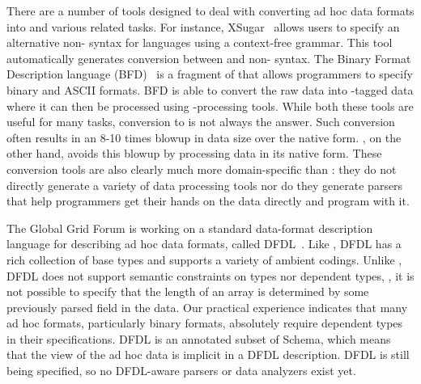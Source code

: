 There are a number of tools designed to deal with converting ad hoc
data formats into \xml{} and various related tasks.  For instance,
XSugar~\cite{brabrand+:xsugar2005} allows users to specify an
alternative non-\xml{} syntax for \xml{} languages using a context-free
grammar.  This tool automatically generates conversion between \xml{} and
non-\xml{} syntax.  The Binary Format Description language 
(BFD)~\cite{bfd} is a fragment of
\xml{} that allows programmers to specify binary and ASCII formats.  BFD
is able to convert the raw data into \xml{}-tagged data where it can then be
processed using \xml{}-processing tools.    While both these tools are 
useful for many
tasks, conversion to \xml{} is not always the answer.  Such conversion
often results in an 8-10 times blowup in data size over the native form.
\padsml{}, on the other hand, avoids this blowup by processing data in its 
native form.  These conversion tools are also clearly much more 
domain-specific than \padsml{}:  they do not directly generate a variety of 
data processing tools nor do they generate parsers that help programmers
get their hands on the data directly and program with it.

The Global Grid Forum is working on a standard
data-format description language for describing ad hoc data formats,
called DFDL~\cite{dfdl-proposal,dfdl-primer}.  Like \padsml{},
DFDL{} has a rich collection of base types and supports a variety of
ambient codings.  Unlike \padsml{}, DFDL{} does not support semantic
constraints on types nor dependent types, \eg{}, it is not possible to
specify that the length of an array is determined by some previously parsed field in the
data.  Our practical experience indicates that many ad hoc formats,
particularly binary formats, absolutely require dependent types in their
specifications.  DFDL{} is an annotated subset of \xml{}{} Schema, which means
that the \xml{}{} view of the ad hoc data is implicit in a DFDL{}
description.  DFDL{} is still being specified, so no DFDL-aware
parsers or data analyzers exist yet.  


